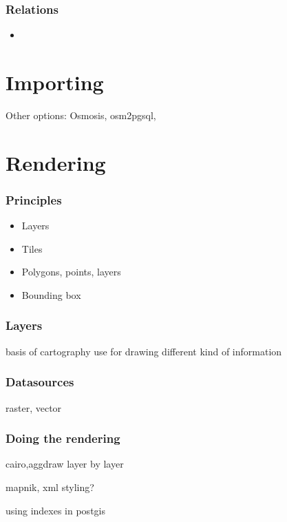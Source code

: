 \documentclass{beamer}
\begin{document}
\begin{frame}
  \frametitle{Relations}
  \begin{itemize}
  \item
  \end{itemize}
\end{frame}

\section{Importing}

Other options: Osmosis, osm2pgsql,

\section{Rendering}

\begin{frame}
  \frametitle{Principles}
  \begin{itemize}
  \item Layers
  \item Tiles
  \item Polygons, points, layers
  \item Bounding box %
  \end{itemize}
\end{frame}

\begin{frame}
  \frametitle{Layers}
  basis of cartography
  use for drawing different kind of information

\end{frame}

\begin{frame}
  \frametitle{Datasources}
  raster, vector
\end{frame}

\begin{frame}
  \frametitle{Doing the rendering}
  cairo,aggdraw
  layer by layer
\end{frame}

\begin{frame}
  mapnik, xml styling?
\end{frame}

\begin{frame}
  using indexes in postgis
\end{frame}

\begin{frame}

\end{frame}
\end{document}
